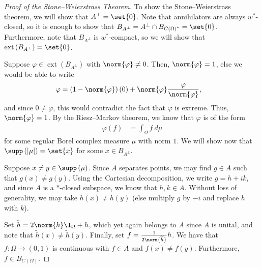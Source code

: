 \documentclass[10pt]{mypackage}
\begin{document}
\begin{proof}[Proof of the Stone--Weierstrass Theorem]
  To show the Stone--Weierstrass theorem, we will show that $A^{\perp} = \set{0}$. Note that annihilators are always $w^{\ast}$-closed, so it is enough to show that $B_{A^{\perp}} = A^{\perp}\cap B_{C\left( \Omega \right)^{\ast}} = \set{0}$. Furthermore, note that $B_{A^{\perp}}$ is $w^{\ast}$-compact, so we will show that $\operatorname{ext}\left( B_{A^{\perp}} \right) = \set{0}$.\newline

  Suppose $\varphi\in \operatorname{ext}\left( B_{A^{\perp}} \right)$ with $\norm{\varphi}\neq 0$. Then, $\norm{\varphi} = 1$, else we would be able to write
  \begin{align*}
    \varphi &= \left( 1-\norm{\varphi} \right)\left( 0 \right) + \norm{\varphi} \frac{\varphi}{\norm{\varphi}},
  \end{align*}
  and since $0\neq \varphi$, this would contradict the fact that $\varphi$ is extreme. Thus, $\norm{\varphi} = 1$. By the Riesz--Markov theorem, we know that $\varphi$ is of the form
  \begin{align*}
    \varphi(f) &= \int_{\Omega}^{} f\:d\mu
  \end{align*}
  for some regular Borel complex measure $\mu$ with norm $1$. We will show now that $\supp\left( \left\vert \mu \right\vert \right) = \set{x}$ for some $x\in B_{A^{\perp}}$.\newline

  Suppose $x\neq y\in \supp\left( \mu \right)$. Since $A$ separates points, we may find $g\in A$ such that $g(x)\neq g(y)$. Using the Cartesian decomposition, we write $g = h + ik$, and since $A$ is a $\ast$-closed subspace, we know that $h,k\in A$. Without loss of generality, we may take $h(x) \neq h(y)$ (else multiply $g$ by $-i$ and replace $h$ with $k$).\newline

  Set $\widetilde{h} = 2\norm{h}\1_{\Omega} + h$, which yet again belongs to $A$ since $A$ is unital, and note that $\widetilde{h}\left( x \right) \neq \widetilde{h}\left( y \right)$. Finally, set $f = \frac{1}{2\norm{\widetilde{h}}}h$. We have that $f\colon \Omega\rightarrow (0,1)$ is continuous with $f\in A$ and $f(x)\neq f(y)$. Furthermore, $f\in B_{C\left( \Omega \right)}$.\newline


\end{proof}
\end{document}
